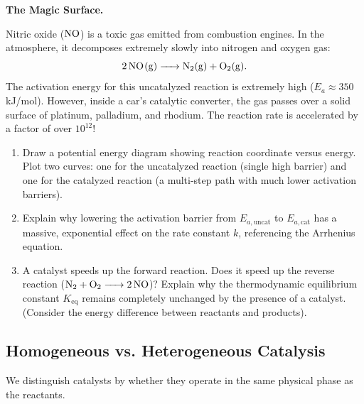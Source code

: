\documentclass[12pt, a4paper]{book}
\begin{document}
\begin{puzzlebox}
\textbf{The Magic Surface.}

Nitric oxide ($\ce{NO}$) is a toxic gas emitted from combustion engines. In the atmosphere, it decomposes extremely slowly into nitrogen and oxygen gas:
\[
  \ce{2 NO(g) -> N2(g) + O2(g)}.
\]
The activation energy for this uncatalyzed reaction is extremely high ($E_a \approx 350$ kJ/mol).
However, inside a car's catalytic converter, the gas passes over a solid surface of platinum, palladium, and rhodium. The reaction rate is accelerated by a factor of over $10^{12}$!
\begin{enumerate}[label=(\alph*), leftmargin=*]
  \item Draw a potential energy diagram showing reaction coordinate versus energy. Plot two curves: one for the uncatalyzed reaction (single high barrier) and one for the catalyzed reaction (a multi-step path with much lower activation barriers).
  \item Explain why lowering the activation barrier from $E_{a,\text{uncat}}$ to $E_{a,\text{cat}}$ has a massive, exponential effect on the rate constant $k$, referencing the Arrhenius equation.
  \item A catalyst speeds up the forward reaction. Does it speed up the reverse reaction ($\ce{N2 + O2 -> 2NO}$)? Explain why the thermodynamic equilibrium constant $K_{\text{eq}}$ remains completely unchanged by the presence of a catalyst. (Consider the energy difference between reactants and products).
\end{enumerate}
\end{puzzlebox}

\subsection{Homogeneous vs. Heterogeneous Catalysis}

We distinguish catalysts by whether they operate in the same physical phase as the reactants.
\end{document}
